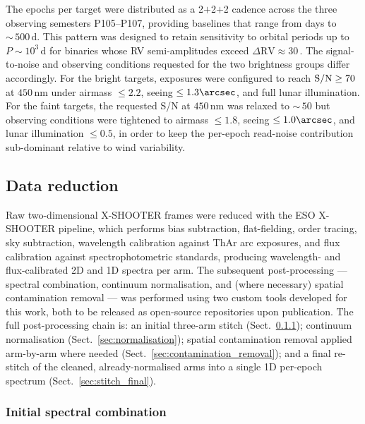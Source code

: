 The \Nepochs epochs per target were distributed as a 2$+$2$+$2 cadence
across the three observing semesters P105--P107, providing baselines
that range from days to ${\sim}\,500$\,d. This pattern was designed to
retain sensitivity to orbital periods up to $P \sim 10^{3}$\,d for
binaries whose RV semi-amplitudes exceed
$\Delta\mathrm{RV} \approx 30$\,\kms. The signal-to-noise and observing
conditions requested for the two brightness groups differ accordingly.
For the \Nbright bright targets, exposures were configured to reach
$\mathrm{S/N} \geq 70$ at $450$\,nm under airmass $\leq 2.2$,
seeing $\leq 1.3\arcsec$, and full lunar illumination. For the
\Nfaint faint targets, the requested S/N at $450$\,nm was relaxed to
${\sim}\,50$ but observing conditions were tightened to airmass
$\leq 1.8$, seeing $\leq 1.0\arcsec$, and lunar illumination
$\leq 0.5$, in order to keep the per-epoch read-noise contribution
sub-dominant relative to wind variability.

\subsection{Data reduction}
\label{sec:reduction}

Raw two-dimensional X-SHOOTER frames were reduced with the ESO
X-SHOOTER pipeline, which performs bias subtraction, flat-fielding,
order tracing, sky subtraction, wavelength calibration against ThAr arc
exposures, and flux calibration against spectrophotometric standards,
producing wavelength- and flux-calibrated 2D and 1D spectra per arm.
The subsequent post-processing --- spectral combination, continuum
normalisation, and (where necessary) spatial contamination removal ---
was performed using two custom tools developed for this work, both to
be released as open-source repositories upon publication. The full
post-processing chain is: an initial three-arm stitch
(Sect.~\ref{sec:stitch_initial}); continuum normalisation
(Sect.~\ref{sec:normalisation}); spatial contamination removal applied
arm-by-arm where needed (Sect.~\ref{sec:contamination_removal}); and a
final re-stitch of the cleaned, already-normalised arms into a single
1D per-epoch spectrum (Sect.~\ref{sec:stitch_final}).

\subsubsection{Initial spectral combination}
\label{sec:stitch_initial}

